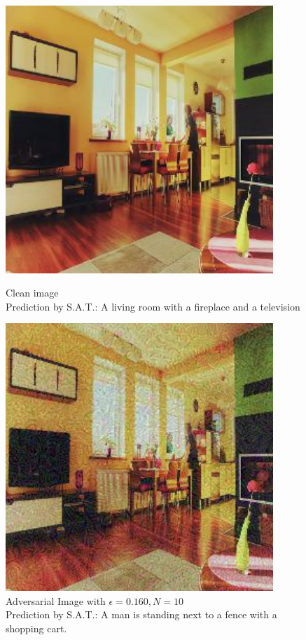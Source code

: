 \begin{figure}[ht]
    \centering
    \begin{minipage}{0.45\textwidth}
        \centering
        \includegraphics[width=0.9\textwidth]{../code/ShowDistractAndDeceive/samples/0.000/img_0.jpg} %
        \caption*{Clean image\\Prediction by S.A.T.: A living room with a fireplace and a television}
    \end{minipage}\hfill
    \begin{minipage}{0.45\textwidth}
        \centering
        \includegraphics[width=0.9\textwidth]{../code/ShowDistractAndDeceive/samples/0.160/img_0.jpg} %
        \caption*{Adversarial Image with $\epsilon=0.160, N=10$\\Prediction by S.A.T.: A man is standing next to a fence with a shopping cart.}
    \end{minipage}
\end{figure}

